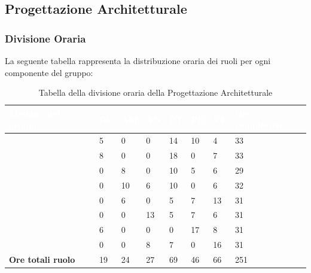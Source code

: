 \subsection{Progettazione Architetturale}

\subsubsection{Divisione Oraria}
La seguente tabella rappresenta la distribuzione oraria dei ruoli per ogni componente del gruppo:
{
\renewcommand{\arraystretch}{2}
\begin{longtable}[h!] { C{4cm} C{1cm} C{1cm} C{1cm} C{1cm} C{1cm} C{1cm} C{3cm}}
\caption{Tabella della divisione oraria della Progettazione Architetturale}\\

\textcolor{white}{\textbf{Membro del gruppo}} & 
\textcolor{white}{\textbf{RE}} & 
\textcolor{white}{\textbf{AM}} & 
\textcolor{white}{\textbf{AN}} & 
\textcolor{white}{\textbf{PT}} & 
\textcolor{white}{\textbf{PR}} & 
\textcolor{white}{\textbf{VE}} & 
\textcolor{white}{\textbf{Ore complessive}}\\	
\endhead
        
\MC{}                     &  5 &  0 &  0 & 14 & 10 &  4 &  33 \\
\LD{}                     &  8 &  0 &  0 & 18 &  0 &  7 &  33 \\
\CE{}                     &  0 &  8 &  0 & 10 &  5 &  6 &  29 \\
\SE{}                     &  0 & 10 &  6 & 10 &  0 &  6 &  32 \\
\PF{}                     &  0 &  6 &  0 &  5 &  7 & 13 &  31 \\
\DF{}                     &  0 &  0 & 13 &  5 &  7 &  6 &  31 \\
\BR{}                     &  6 &  0 &  0 &  0 & 17 &  8 &  31 \\
\AT{}                     &  0 &  0 &  8 &  7 &  0 & 16 &  31 \\
\textbf{Ore totali ruolo} & 19 & 24 & 27 & 69 & 46 & 66 & 251 \\
		
\end{longtable}
}

